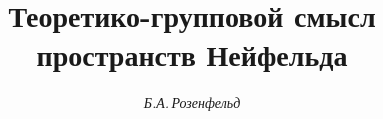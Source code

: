 









\newcommand{\A}{{\cal A}}


\newcommand{\col}{\operatorname{col}}


\newcommand{\tts}[1]{}










\setcounter{page}{65}












\author{\it Б.А.\,Розенфельд}




\title{Теоретико-групповой смысл \\


пространств Нейфельда}





\date{}







\pagestyle{plain} %













